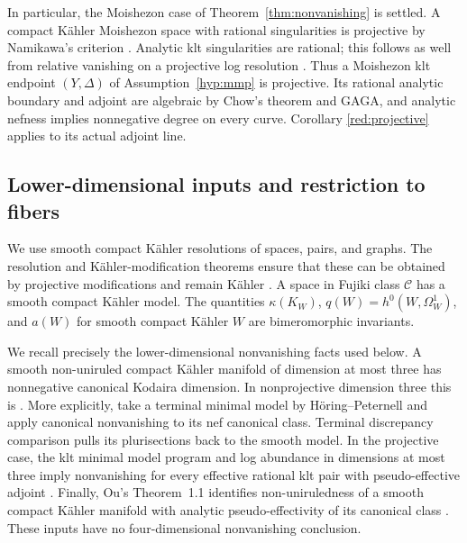 In particular, the Moishezon case of Theorem~\ref{thm:nonvanishing} is
settled. A compact Kähler Moishezon space with rational singularities is
projective by Namikawa's criterion \cite{NamikawaProjectivity}. Analytic klt
singularities are rational; this follows as well from relative vanishing
on a projective log resolution \cite{FujinoAnalyticMMP}. Thus a
Moishezon klt endpoint \((Y,\Delta)\) of
Assumption~\ref{hyp:mmp} is projective. Its rational analytic boundary
and adjoint are algebraic by Chow's theorem and GAGA, and analytic
nefness implies nonnegative degree on every curve. Corollary
\ref{red:projective} applies to its actual adjoint line.

\subsection{Lower-dimensional inputs and restriction to fibers}

We use smooth compact Kähler resolutions of spaces, pairs, and graphs.
The resolution and Kähler-modification theorems ensure that these can
be obtained by projective modifications and remain Kähler
\cite{HironakaResolution,VarouchasKahler}. A space in Fujiki class \(\mathcal C\)
has a smooth compact Kähler model. The quantities
\(\kappa(K_W)\), \(q(W)=h^0(W,\Omega_W^1)\), and \(a(W)\) for smooth
compact Kähler \(W\) are bimeromorphic invariants.

We recall precisely the lower-dimensional nonvanishing facts used
below. A smooth non-uniruled compact Kähler manifold of dimension at
most three has nonnegative canonical Kodaira dimension. In
nonprojective dimension three this is
\cite[Corollary~1.4]{HPMinimalModels}. More explicitly, take a terminal
minimal model by Höring--Peternell and apply canonical nonvanishing
\cite[Theorem~0.3]{DemaillyPeternellNonvanishing} to its nef canonical
class. Terminal discrepancy comparison pulls its plurisections back
to the smooth model.
In the projective case, the klt minimal model program and log abundance
in dimensions at most three imply nonvanishing for every effective
rational klt pair with pseudo-effective adjoint \cite{ThreefoldFlipsAbundance,KeelMatsukiMcKernan,KeelMatsukiMcKernanCorrection}.
Finally, Ou's Theorem~1.1 identifies non-uniruledness of a smooth compact
Kähler manifold with analytic pseudo-effectivity of its canonical class
\cite{OuUniruledness}. These inputs have no four-dimensional nonvanishing
conclusion.

